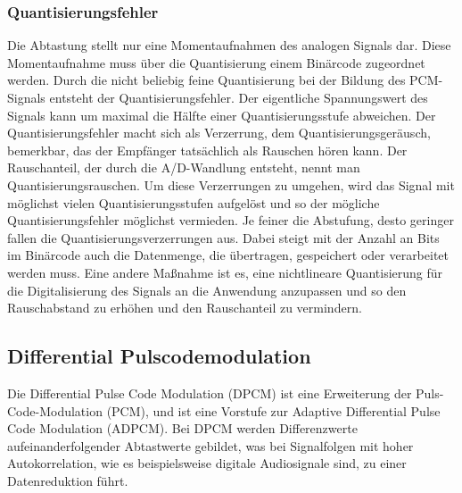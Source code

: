 \documentclass[a4paper,10pt]{article}
\begin{document}
\subsubsection{Quantisierungsfehler}
Die Abtastung stellt nur eine Momentaufnahmen des analogen Signals dar. Diese Momentaufnahme muss über die Quantisierung einem Binärcode zugeordnet werden. 
Durch die nicht beliebig feine Quantisierung bei der Bildung des PCM-Signals entsteht der Quantisierungsfehler. Der eigentliche Spannungswert des Signals kann 
um maximal die Hälfte einer Quantisierungsstufe abweichen. Der Quantisierungsfehler macht sich als Verzerrung, dem Quantisierungsgeräusch, bemerkbar, 
das der Empfänger tatsächlich als Rauschen hören kann. Der Rauschanteil, der durch die A/D-Wandlung entsteht, nennt man Quantisierungsrauschen.
Um diese Verzerrungen zu umgehen, wird das Signal mit möglichst vielen Quantisierungsstufen aufgelöst und so der mögliche Quantisierungsfehler möglichst
vermieden. Je feiner die Abstufung, desto geringer fallen die Quantisierungsverzerrungen aus. Dabei steigt mit der Anzahl an Bits im Binärcode auch die
Datenmenge, die übertragen, gespeichert oder verarbeitet werden muss. Eine andere Maßnahme ist es, eine nichtlineare Quantisierung für die Digitalisierung
des Signals an die Anwendung anzupassen und so den Rauschabstand zu erhöhen und den Rauschanteil zu vermindern.

\subsection{Differential Pulscodemodulation}
Die Differential Pulse Code Modulation (DPCM) ist eine Erweiterung der Puls-Code-Modulation (PCM), und ist eine Vorstufe zur
Adaptive Differential Pulse Code Modulation (ADPCM). Bei DPCM werden Differenzwerte aufeinanderfolgender Abtastwerte gebildet, 
was bei Signalfolgen mit hoher Autokorrelation, wie es beispielsweise digitale Audiosignale sind, zu einer Datenreduktion führt.
\end{document}
